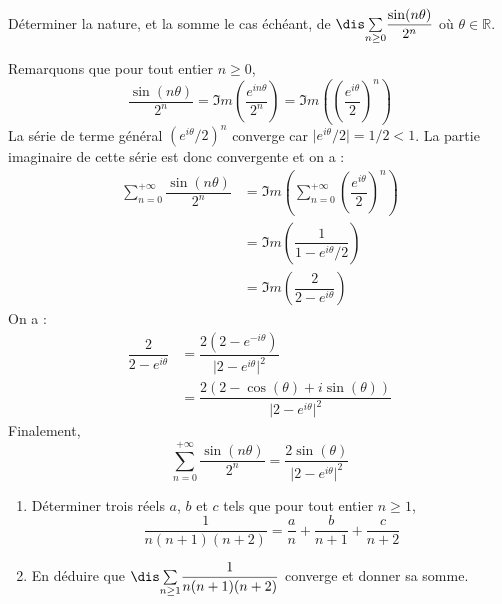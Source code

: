 \documentclass[a4paper,10pt]{report}
\newcommand{\Sum}[2]{\ensuremath{\textstyle{\sum\limits_{#1}^{#2}}}}
\begin{document}
\medskip

\begin{Exa} Déterminer la nature, et la somme le cas échéant, de $\dis \Sum{n \geq 0}{} \dfrac{\sin(n \theta)}{2^n}$ où $\theta \in \mathbb{R}$.
\end{Exa}

\corr Remarquons que pour tout entier $n \geq 0$,
$$ \dfrac{\sin(n \theta)}{2^n} = \Im m \left( \dfrac{e^{i n\theta}}{2^n} \right) = \Im m \left(\left( \dfrac{e^{i \theta}}{2} \right)^n \right)$$
La série de terme général $(e^{i \theta}/2)^n$ converge car $\vert e^{i \theta}/2 \vert = 1/2 <1$. La partie imaginaire de cette série est donc convergente et on a :
\begin{align*}
\sum_{n=0}^{+ \infty}  \dfrac{\sin(n \theta)}{2^n}  & = \Im m \left( \sum_{n=0}^{+ \infty} \left( \dfrac{e^{i \theta}}{2} \right)^n \right) \\
& = \Im m \left( \dfrac{1}{1-e^{i \theta}/2} \right) \\
& = \Im m \left( \dfrac{2}{2- e^{i \theta}} \right)
\end{align*}
On a :
\begin{align*}
\dfrac{2}{2- e^{i \theta}} & = \dfrac{2(2-e^{- i\theta})}{\vert 2- e^{i \theta} \vert^2} \\
& = \dfrac{2(2- \cos(\theta)+i \sin(\theta))}{\vert 2- e^{i \theta} \vert^2}
\end{align*}
Finalement,
$$ \sum_{n=0}^{+ \infty}  \dfrac{\sin(n \theta)}{2^n} = \dfrac{2\sin(\theta)}{\vert 2- e^{i \theta} \vert^2}$$

\medskip


\begin{Exa} 
\begin{enumerate}
\item Déterminer trois réels $a$, $b$ et $c$ tels que pour tout entier $n \geq 1$,
$$ \frac{1}{n(n+1)(n+2)} = \frac{a}{n} + \frac{b}{n+1} + \frac{c}{n+2}$$
\item En déduire que $\dis \Sum{n \geq 1}{} \dfrac{1}{n(n+1)(n+2)}$ converge et donner sa somme.
\end{enumerate}
\end{Exa}
\end{document}
